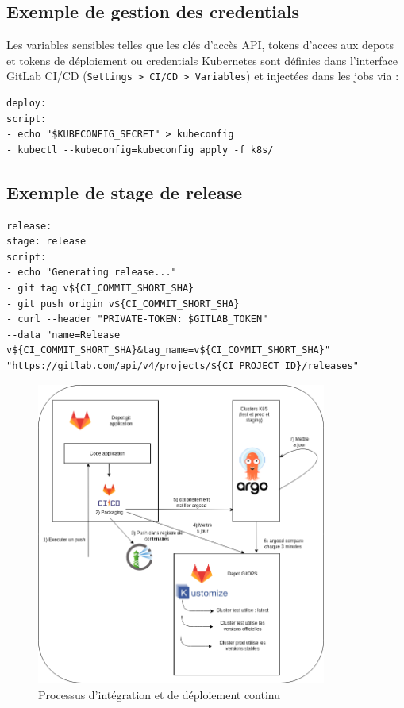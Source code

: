 \subsection{Exemple de gestion des credentials}
Les variables sensibles telles que les clés d’accès API, tokens d'acces aux depots et tokens de déploiement ou credentials Kubernetes sont définies dans l’interface GitLab CI/CD (\texttt{Settings > CI/CD > Variables}) et injectées dans les jobs via :
\begin{verbatim}
deploy:
script:
- echo "$KUBECONFIG_SECRET" > kubeconfig
- kubectl --kubeconfig=kubeconfig apply -f k8s/
\end{verbatim}

\subsection{Exemple de stage de release}
\begin{verbatim}
release:
stage: release
script:
- echo "Generating release..."
- git tag v${CI_COMMIT_SHORT_SHA}
- git push origin v${CI_COMMIT_SHORT_SHA}
- curl --header "PRIVATE-TOKEN: $GITLAB_TOKEN"
--data "name=Release v${CI_COMMIT_SHORT_SHA}&tag_name=v${CI_COMMIT_SHORT_SHA}"
"https://gitlab.com/api/v4/projects/${CI_PROJECT_ID}/releases"
\end{verbatim}

\begin{figure}[H]
	\centering
	\includegraphics[width=0.85\textwidth]{figures/gitlab-ci.png}
	\caption{Processus d'intégration et de déploiement continu}
\end{figure}

